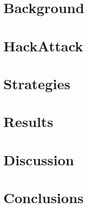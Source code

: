 \documentclass{sig-alternate}
\begin{document}
\section{Background}
\label{sec:background}


\section{HackAttack}
\label{sec:hackattack}


\section{Strategies}
\label{sec:strategies}


% 

\section{Results}
\label{sec:results}


\section{Discussion}
\label{sec:discussion}


\section{Conclusions}
\label{sec:conc}




%

%
%

\balancecolumns
\end{document}
